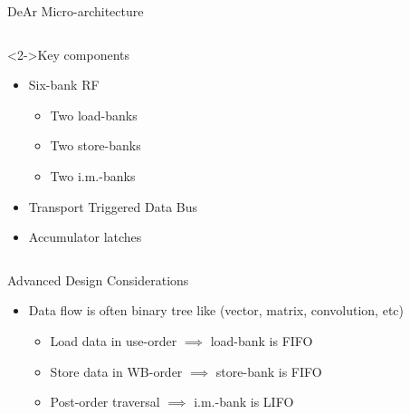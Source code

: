 \documentclass{beamer}
\begin{document}
\begin{CJK}{UTF8}{bkai}
\begin{frame}{DeAr Micro-architecture}
\begin{columns}
\begin{column}{0.35\textwidth}
                        \begin{block}<2->{Key components}
                            \begin{itemize}
                                \item <3->
                                {
                                    Six-bank RF
                                    \begin{itemize}
                                        \item Two load-banks
                                        \item Two store-banks
                                        \item Two i.m.-banks
                                    \end{itemize}
                                }
                                \item <4->{Transport Triggered Data Bus}
                                \item <5->{Accumulator latches}
                            \end{itemize}    
                        \end{block}
                    \end{column}
                \end{columns}
            \end{frame}

            \begin{frame}{Advanced Design Considerations}
                \centering
                {
                }
                \pause
                \begin{itemize}
                    \item {Data flow is often binary tree like (vector, matrix, convolution, etc)
                        \begin{itemize}
                                \pause
                                \item Load data in use-order $\implies$ load-bank is FIFO
                                \pause
                                \item Store data in WB-order $\implies$ store-bank is FIFO
                                \pause
                                \item Post-order traversal $\implies$ i.m.-bank is LIFO
                        \end{itemize}}
                \end{itemize}
            \end{frame}


\end{CJK}
\end{document}
